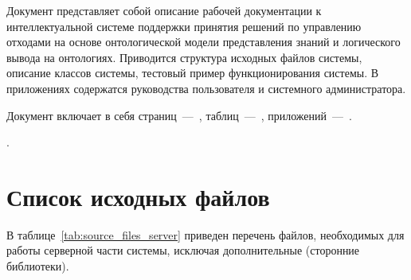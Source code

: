 \documentclass[a4paper]{G2-105}
\begin{document}
%
\VSTUInitializeRD
%


Документ представляет собой описание рабочей документации к интеллектуальной системе поддержки принятия решений по управлению отходами на основе онтологической модели представления знаний и логического вывода на онтологиях. Приводится структура исходных файлов системы, описание классов системы, тестовый пример функционирования системы. В приложениях содержатся руководства пользователя и системного администратора.

Документ включает в себя страниц~---~\totalpages, таблиц~---~\totaltables, приложений~---~\totalappendices.

\CommonKeywords.

\newpage

\tableofcontents

\newpage

\chapter{Список исходных файлов}

В таблице~\ref{tab:source_files_server} приведен перечень файлов, необходимых для работы серверной части системы, исключая дополнительные (сторонние библиотеки).
\end{document}
